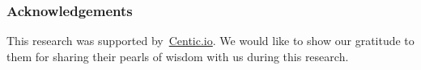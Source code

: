 \documentclass[runningheads]{llncs}
\begin{document}
{%



\vspace{2mm}

\subsubsection*{Acknowledgements} This research was supported by~\href{https://centic.io/}{Centic.io}. We would like to show our gratitude to them for sharing their pearls of wisdom with us during this research.


%
%
%

}
\end{document}
